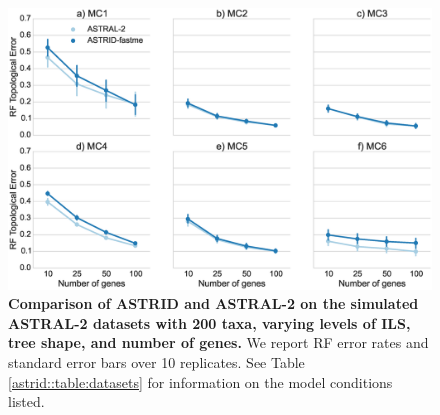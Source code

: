 \begin{figure}
  \centering
  \includegraphics[width=12cm]{astrid-figs/astral2-ils.eps}
  \caption[Comparison of ASTRID and ASTRAL-2
 on the simulated ASTRAL-2 datasets]{\textbf{Comparison of ASTRID and ASTRAL-2
 on the simulated ASTRAL-2 datasets
      with 200 taxa, varying levels of ILS, tree shape, and number of genes.}
     We report RF error
    rates and standard error 
bars over 10 replicates. See Table \ref{astrid::table:datasets} for
information on the model conditions listed. }
  \label{astrid::fig:astral2-ils}
\end{figure}

